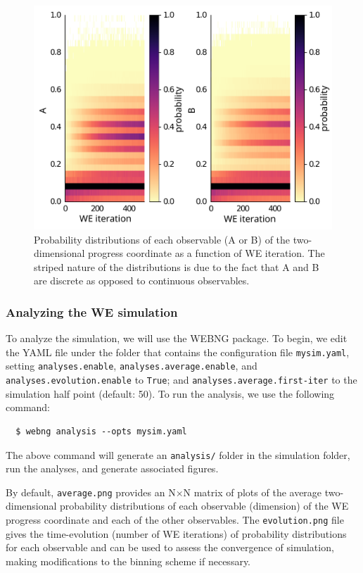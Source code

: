 \begin{figure}[t]
\centering
\includegraphics[width=\columnwidth]{figures/Figure15_ProbDist2.pdf}
\caption{Probability distributions of each observable (A or B) of the two-dimensional progress coordinate as a function of WE iteration. 
The striped nature of the distributions is due to the fact that A and B are discrete as opposed to continuous observables.}
\end{figure}

\subsubsection{Analyzing the WE simulation}
To analyze the simulation, we will use the WEBNG package. 
To begin, we edit the YAML file under the folder that contains the configuration file \verb|mysim.yaml|, setting \verb|analyses.enable|, \verb|analyses.average.enable|, and \verb|analyses.evolution.enable| to \verb|True|; and \verb|analyses.average.first-iter| to the simulation half point (default: 50). 
To run the analysis, we use the following command: 

\begin{verbatim}
  $ webng analysis --opts mysim.yaml
\end{verbatim}

The above command will generate an \verb|analysis/| folder in the simulation folder, run the analyses, and generate associated figures. 

By default, \verb|average.png| provides an N$\times$N matrix of plots of the average two-dimensional probability distributions of each observable (dimension) of the WE progress coordinate and each of the other observables. 
The \verb|evolution.png| file gives the time-evolution (number of WE iterations) of probability distributions for each observable and can be used to assess the convergence of simulation, making modifications to the binning scheme if necessary. 


